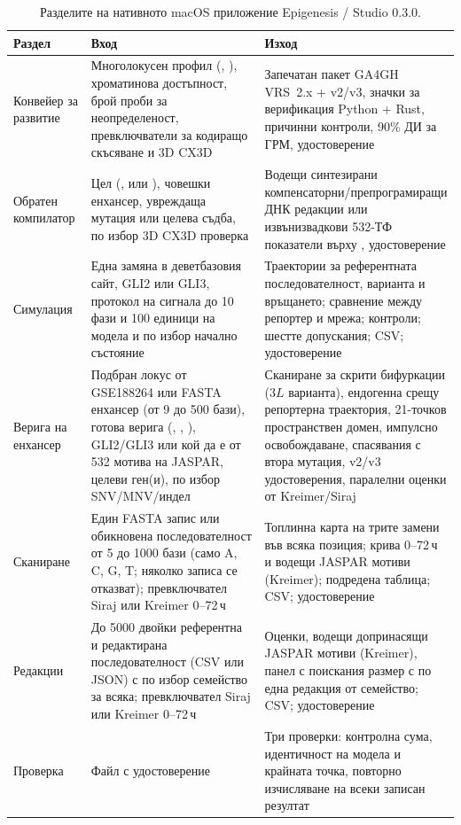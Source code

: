 \documentclass[10.5pt,a4paper]{article}
\begin{document}
\begin{table}[tb]
\small
\caption{Разделите на нативното macOS приложение Epigenesis / Studio 0.3.0.}\label{tab:studio}
\begin{tabular}{@{}L{27mm}L{55mm}L{66mm}@{}}
\toprule
Раздел & Вход & Изход \\
\midrule
Конвейер за развитие & Многолокусен профил (, ), хроматинова достъпност, брой проби за неопределеност, превключватели за кодиращо скъсяване и 3D CX3D & Запечатан пакет GA4GH VRS~2.x +  v2/v3, значки за верификация Python + Rust, причинни контроли, 90\% ДИ за ГРМ, удостоверение \\
Обратен компилатор & Цел (,  или ), човешки енхансер, увреждаща мутация или целева съдба, по избор 3D CX3D проверка & Водещи синтезирани компенсаторни/препрограмиращи ДНК редакции или извънизвадкови 532-ТФ показатели върху , удостоверение \\
Симулация & Една замяна в деветбазовия сайт, GLI2 или GLI3, протокол на сигнала до 10 фази и 100 единици на модела и по избор начално състояние & Траектории за референтната последователност, варианта и връщането; сравнение между репортер и мрежа; контроли; шестте допускания; CSV; удостоверение \\
Верига на енхансер & Подбран локус от GSE188264 или FASTA енхансер (от 9 до 500 бази), готова верига (, , ), GLI2/GLI3 или кой да е от 532 мотива на JASPAR, целеви ген(и), по избор SNV/MNV/индел & Сканиране за скрити бифуркации ($3L$ варианта), ендогенна срещу репортерна траектория, 21-точков пространствен домен, импулсно освобождаване, спасявания с втора мутация,  v2/v3 удостоверения, паралелни оценки от Kreimer/Siraj \\
Сканиране & Един FASTA запис или обикновена последователност от 5 до 1000 бази (само A, C, G, T; няколко записа се отказват); превключвател Siraj или Kreimer 0--72\,ч & Топлинна карта на трите замени във всяка позиция; крива 0--72\,ч и водещи JASPAR мотиви (Kreimer); подредена таблица; CSV; удостоверение \\
Редакции & До 5000 двойки референтна и редактирана последователност (CSV или JSON) с по избор семейство за всяка; превключвател Siraj или Kreimer 0--72\,ч & Оценки, водещи допринасящи JASPAR мотиви (Kreimer), панел с поискания размер с по една редакция от семейство; CSV; удостоверение \\
Проверка & Файл с удостоверение & Три проверки: контролна сума, идентичност на модела и крайната точка, повторно изчисляване на всеки записан резултат \\
\bottomrule
\end{tabular}
\end{table}
\end{document}
